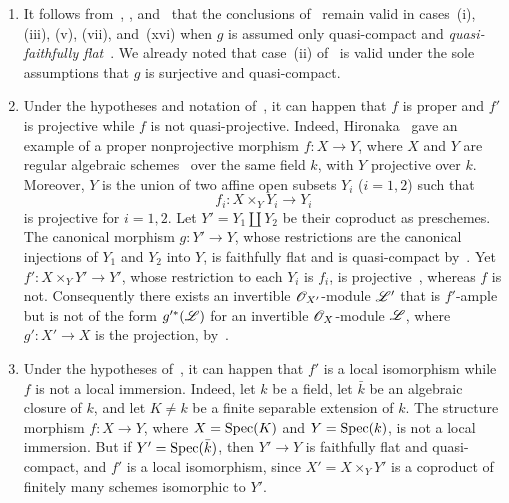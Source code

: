\begin{remarks}[2.7.3]
\label{IV.2.7.3}
\begin{enumerate}
  \item[(i)] It follows from~, ,
  and~ that the conclusions of~
  remain valid in cases~(i), (iii), (v), (vii), and~(xvi) when $g$ is
  assumed only quasi-compact and \emph{quasi-faithfully
  flat}~. We already noted that case~(ii)
  of~ is valid under the sole assumptions that $g$ is
  surjective and quasi-compact.

  \item[(ii)] Under the hypotheses and notation of~,
  it can happen that $f$ is proper and $f'$ is projective while $f$ is
  not quasi-projective. Indeed, Hironaka~\cite{IV-34} gave an example
  of a proper nonprojective morphism $f:X\to Y$, where $X$ and $Y$ are
  regular algebraic schemes~ over the same field
  $k$, with $Y$ projective over $k$. Moreover, $Y$ is the union of two
  affine open subsets $Y_i$ \textnormal{(}$i=1,2$\textnormal{)} such
  that
  \[
    f_i:X\times_Y Y_i\longrightarrow Y_i
  \]
  is projective for $i=1,2$. Let $Y'=Y_1\amalg Y_2$ be their
  coproduct as preschemes. The canonical morphism $g:Y'\to Y$, whose
  restrictions are the canonical injections of $Y_1$ and $Y_2$ into
  $Y$, is faithfully flat and is quasi-compact by~.
  Yet $f':X\times_Y Y'\to Y'$, whose restriction to each $Y_i$ is
  $f_i$, is projective~, whereas $f$ is not.
  Consequently there exists an invertible $\mathscr{O}_{X'}$-module
  $\mathscr{L}'$ that is $f'$-ample but is not of the form
  $g'^*(\mathscr{L})$ for an invertible $\mathscr{O}_X$-module $\mathscr{L}$, where
  $g':X'\to X$ is the projection, by~.

  \item[(iii)] Under the hypotheses of~, it can happen
  that $f'$ is a local isomorphism while $f$ is not a local immersion.
  Indeed, let $k$ be a field, let $\bar{k}$ be an algebraic closure of
  $k$, and let $K\neq k$ be a finite separable extension of $k$. The
  structure morphism $f:X\to Y$, where $X=\operatorname{Spec}(K)$ and
  $Y=\operatorname{Spec}(k)$, is not a local immersion. But if
  $Y'=\operatorname{Spec}(\bar{k})$, then $Y'\to Y$ is faithfully flat and
  quasi-compact, and $f'$ is a local isomorphism, since
  $X'=X\times_Y Y'$ is a coproduct of finitely many schemes isomorphic
  to $Y'$.
\end{enumerate}
\end{remarks}

